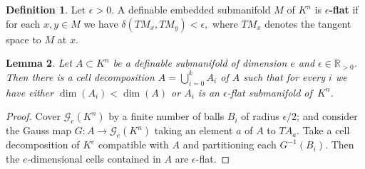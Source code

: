 \documentclass[a4paper, 12pt, final]{article}
\newtheorem{lem}{Lemma}[section]
\newtheorem{open problem}[lem]{Open problem}
\theoremstyle{remark}
\theoremstyle{definition}
\newtheorem{dfn}[lem]{Definition}
\newtheorem{final remark}[lem]{Final remark}
\begin{document}
\begin{dfn}
Let $\epsilon>0$. A definable embedded submanifold $M$ of $K^n$ is \textbf{$\epsilon$-flat} if for each $x,y\in M$ we have $\delta(TM_x,TM_y)<\epsilon,$ where $TM_x$ denotes the tangent space to $M$ at $x$.
\end{dfn}

\begin{lem}\label{flat} 
Let $A\subset{K}^n$ be a definable submanifold of dimension $e$ and
$\epsilon\in{\mathbb{R}}_{>0}$. Then there is a cell decomposition $A =
\bigcup_{i=0}^k A_i$ of $A$ such that for every $i$ we have either $\dim(A_i)
< \dim(A)$ or $A_i$ is an $\epsilon$-flat submanifold of~${K}^n$. 
\end{lem}
\begin{proof} 
Cover $\mathcal G_e({K}^n)$ by a finite number of balls $B_i$ of radius $\epsilon/2$; and consider the Gauss map $G:A\to\mathcal G_e({K}^n)$ taking an element $a$ of $A$ to $TA_a$. Take a cell decomposition of ${K}^e$ compatible with $A$ and partitioning each $G^{-1}(B_i)$. Then the $e$-dimensional cells contained in $A$ are $\epsilon$-flat. 
\end{proof}
 
\end{document}
